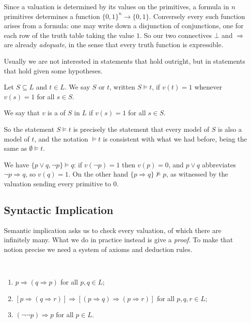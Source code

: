 \begin{remark}
  Since a valuation is determined by its values on the primitives, a formula in $n$ primitives determines a function $\{0,1\}^n \to \{0,1\}$. Conversely every such function arises from a formula: one may write down a disjunction of conjunctions, one for each row of the truth table taking the value $1$. So our two connectives $\bot$ and $\Rightarrow$ are already \emph{adequate}, in the sense that every truth function is expressible.
\end{remark}

Usually we are not interested in statements that hold outright, but in statements that hold given some hypotheses.

\begin{definition}
  Let $S \subseteq L$ and $t \in L$. We say $S$  or  $t$, written $S \models t$, if $v(t) = 1$ whenever $v(s) = 1$ for all $s \in S$.
\end{definition}

\begin{definition}[Model]
  We say that $v$ is a  of $S$ in $L$ if $v(s) = 1$ for all $s \in S$.
\end{definition}

So the statement $S \models t$ is precisely the statement that every model of $S$ is also a model of $t$, and the notation $\models t$ is consistent with what we had before, being the same as $\emptyset \models t$.

\begin{example}
  We have $\{p \lor q, \lnot p\} \models q$: if $v(\lnot p) = 1$ then $v(p) = 0$, and $p \lor q$ abbreviates $\lnot p \Rightarrow q$, so $v(q) = 1$. On the other hand $\{p \Rightarrow q\} \not\models p$, as witnessed by the valuation sending every primitive to $0$.
\end{example}

\subsection{Syntactic Implication}

Semantic implication asks us to check every valuation, of which there are infinitely many. What we do in practice instead is give a \emph{proof}. To make that notion precise we need a system of axioms and deduction rules.

\begin{axiom}~
  \begin{enumerate}[label=(\arabic*)]
    \item $p \Rightarrow (q \Rightarrow p)$ for all $p, q \in L$;
    \item $[p \Rightarrow (q \Rightarrow r)] \Rightarrow [(p \Rightarrow q) \Rightarrow (p \Rightarrow r)]$ for all $p, q, r \in L$;
    \item $(\lnot \lnot p) \Rightarrow p$ for all $p \in L$.
  \end{enumerate}
\end{axiom}

